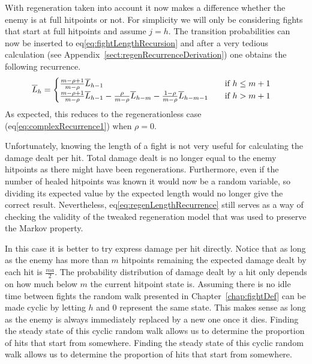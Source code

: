 With regeneration taken into account it now makes a difference whether the enemy is at full hitpoints or not. For simplicity we will only be considering fights that start at full hitpoints and assume $j=h$. The transition probabilities can now be inserted to eq\ref{eq:fightLengthRecursion} and after a very tedious calculation (see Appendix~\ref{sect:regenRecurrenceDerivation}) one obtains the following recurrence.
\begin{align}\label{eq:regenLengthRecurrence}
    \overline{L}_h &= \begin{cases}
        \frac{m-\rho+1}{m-\rho}\overline{L}_{h-1} \quad &\mbox{if } h \leq m+1\\
        \frac{m-\rho+1}{m-\rho}\overline{L}_{h-1} - \frac{\rho}{m-\rho}\overline{L}_{h-m} - \frac{1-\rho}{m-\rho}\overline{L}_{h-m-1} \quad &\mbox{if } h > m+1
    \end{cases}
\end{align}
As expected, this reduces to the regenerationless case (eq\ref{eq:complexRecurrence1}) when $\rho=0$.

Unfortunately, knowing the length of a fight is not very useful for calculating the damage dealt per hit. Total damage dealt is no longer equal to the enemy hitpoints as there might have been regenerations. Furthermore, even if the number of healed hitpoints was known it would now be a random variable, so dividing its expected value by the expected length would no longer give the correct result. Nevertheless, eq\ref{eq:regenLengthRecurrence} still serves as a way of checking the validity of the tweaked regeneration model that was used to preserve the Markov property.

In this case it is better to try express damage per hit directly. Notice that as long as the enemy has more than $m$ hitpoints remaining the expected damage dealt by each hit is $\frac{ma}{2}$. The probability distribution of damage dealt by a hit only depends on how much below $m$ the current hitpoint state is.
Assuming there is no idle time between fights the random walk presented in Chapter~\ref{chap:fightDef} can be made cyclic by letting $h$ and $0$ represent the same state. This makes sense as long as the enemy is always immediately replaced by a new one once it dies. Finding the steady state of this cyclic random walk allows us to determine the proportion of hits that start from somewhere. Finding the steady state of this cyclic random walk allows us to determine the proportion of hits that start from somewhere.
